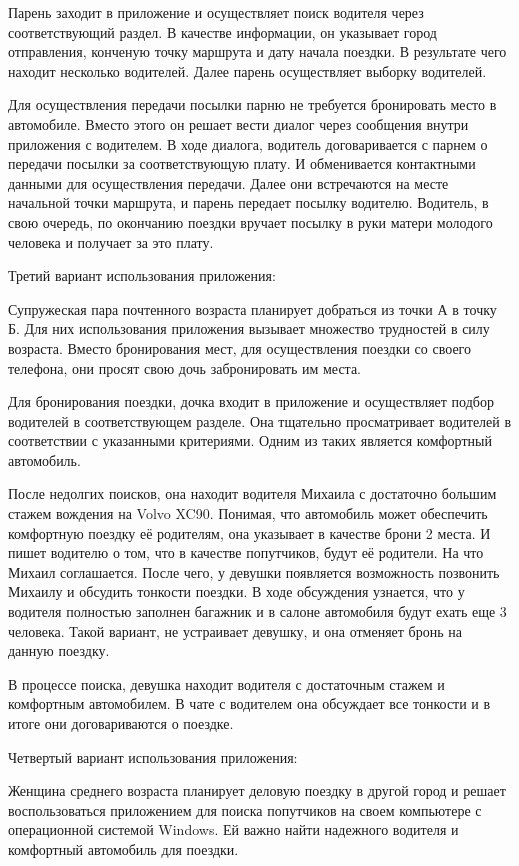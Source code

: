 Парень заходит в приложение и осуществляет поиск водителя через соответствующий раздел. В качестве информации, он указывает город отправления, конченую точку маршрута и дату начала поездки. В результате чего находит несколько водителей. Далее парень осуществляет выборку водителей.

Для осуществления передачи посылки парню не требуется бронировать место в автомобиле. Вместо этого он решает вести диалог через сообщения внутри приложения с водителем. В ходе диалога, водитель договаривается с парнем о передачи посылки за соответствующую плату. И обменивается контактными данными для осуществления передачи.
Далее они встречаются на месте начальной точки маршрута, и парень передает посылку водителю. Водитель, в свою очередь, по окончанию поездки вручает посылку в руки матери молодого человека и получает за это плату.

Третий вариант использования приложения:

Супружеская пара почтенного возраста планирует добраться из точки А в точку Б. Для них использования приложения вызывает множество трудностей в силу возраста. Вместо бронирования мест, для осуществления поездки со своего телефона, они просят свою дочь забронировать им места.

Для бронирования поездки, дочка входит в приложение и осуществляет подбор водителей в соответствующем разделе. Она тщательно просматривает водителей в соответствии с указанными критериями. Одним из таких является комфортный автомобиль. 

После недолгих поисков, она находит водителя Михаила с достаточно большим стажем вождения на Volvo XC90. Понимая, что автомобиль может обеспечить комфортную поездку её родителям, она указывает в качестве брони 2 места. И пишет водителю о том, что в качестве попутчиков, будут её родители. На что Михаил соглашается.
После чего, у девушки появляется возможность позвонить Михаилу и обсудить тонкости поездки. В ходе обсуждения узнается, что у водителя полностью заполнен багажник и в салоне автомобиля будут ехать еще 3 человека. Такой вариант, не устраивает девушку, и она отменяет бронь на данную поездку.

В процессе поиска, девушка находит водителя с достаточным стажем и комфортным автомобилем. В чате с водителем она обсуждает все тонкости и в итоге они договариваются о поездке.

Четвертый вариант использования приложения:

Женщина среднего возраста планирует деловую поездку в другой город и решает воспользоваться приложением для поиска попутчиков на своем компьютере с операционной системой Windows. Ей важно найти надежного водителя и комфортный автомобиль для поездки.

